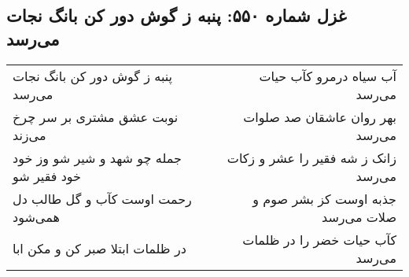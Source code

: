 \begin{center}
\section*{غزل شماره ۵۵۰: پنبه ز گوش دور کن بانگ نجات می‌رسد}
\label{sec:0550}
\begin{longtable}{l p{0.5cm} r}
پنبه ز گوش دور کن بانگ نجات می‌رسد
&&
آب سیاه درمرو کآب حیات می‌رسد
\\
نوبت عشق مشتری بر سر چرخ می‌زند
&&
بهر روان عاشقان صد صلوات می‌رسد
\\
جمله چو شهد و شیر شو وز خود خود فقیر شو
&&
زانک ز شه فقیر را عشر و زکات می‌رسد
\\
رحمت اوست کآب و گل طالب دل همی‌شود
&&
جذبه اوست کز بشر صوم و صلات می‌رسد
\\
در ظلمات ابتلا صبر کن و مکن ابا
&&
کآب حیات خضر را در ظلمات می‌رسد
\\
\end{longtable}
\end{center}
